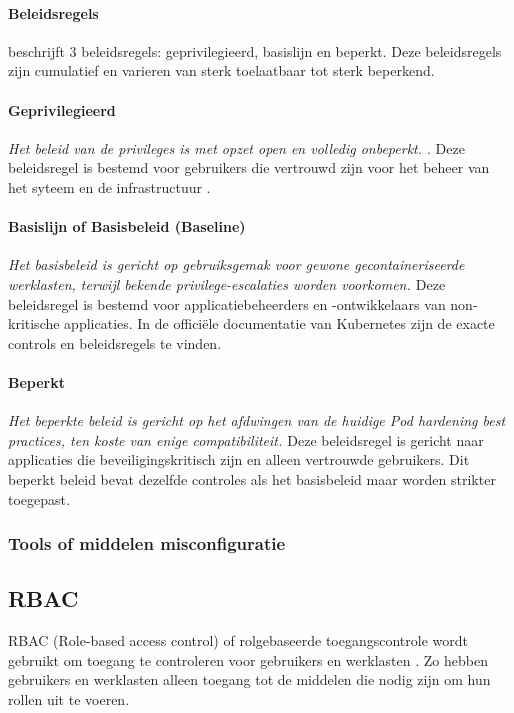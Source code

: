 \paragraph{Beleidsregels}
\textcite{KubernetesDocs-2023} beschrijft 3 beleidsregels: geprivilegieerd, basislijn en beperkt. Deze beleidsregels zijn cumulatief en varieren van sterk toelaatbaar tot sterk beperkend. 

\paragraph{Geprivilegieerd}
\textit{Het beleid van de privileges is met opzet open en volledig onbeperkt. \autocite{KubernetesDocs-2023}}.
Deze beleidsregel is bestemd voor gebruikers die vertrouwd zijn voor het beheer van het syteem en de infrastructuur \autocite{KubernetesDocs-2023}. 

\paragraph{Basislijn of Basisbeleid (Baseline)}
\textit{Het basisbeleid is gericht op gebruiksgemak voor gewone gecontaineriseerde werklasten, terwijl bekende privilege-escalaties worden voorkomen. \autocite{KubernetesDocs-2023}}
Deze beleidsregel is bestemd voor applicatiebeheerders en -ontwikkelaars van non-kritische applicaties.
In de officiële documentatie van Kubernetes zijn de exacte controls en beleidsregels te vinden.

\paragraph{Beperkt}
\textit{Het beperkte beleid is gericht op het afdwingen van de huidige Pod hardening best practices, ten koste van enige compatibiliteit. \autocite{KubernetesDocs-2023}}
Deze beleidsregel is gericht naar applicaties die beveiligingskritisch zijn en alleen vertrouwde gebruikers. 
Dit beperkt beleid bevat dezelfde controles als het basisbeleid maar worden strikter toegepast.

\subsubsection{Tools of middelen misconfiguratie}


\subsection{RBAC}
RBAC (Role-based access control) of rolgebaseerde toegangscontrole wordt gebruikt om toegang te controleren voor gebruikers en werklasten \autocite{nordell2022systematic}.
Zo hebben gebruikers en werklasten alleen toegang tot de middelen die nodig zijn om hun rollen uit te voeren.

